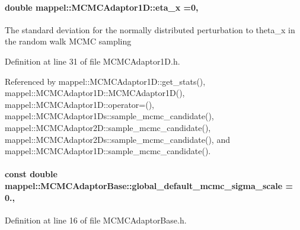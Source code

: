 \paragraph[{\texorpdfstring{eta\+\_\+x}{eta_x}}]{\setlength{\rightskip}{0pt plus 5cm}double mappel\+::\+M\+C\+M\+C\+Adaptor1\+D\+::eta\+\_\+x =0\hspace{0.3cm}{\ttfamily [protected]}, {\ttfamily [inherited]}}\hypertarget{classmappel_1_1MCMCAdaptor1D_ae5787e38c9cef6168acf6fc5d3216693}{}\label{classmappel_1_1MCMCAdaptor1D_ae5787e38c9cef6168acf6fc5d3216693}
The standard deviation for the normally distributed perturbation to theta\+\_\+x in the random walk M\+C\+MC sampling 

Definition at line 31 of file M\+C\+M\+C\+Adaptor1\+D.\+h.



Referenced by mappel\+::\+M\+C\+M\+C\+Adaptor1\+D\+::get\+\_\+stats(), mappel\+::\+M\+C\+M\+C\+Adaptor1\+D\+::\+M\+C\+M\+C\+Adaptor1\+D(), mappel\+::\+M\+C\+M\+C\+Adaptor1\+D\+::operator=(), mappel\+::\+M\+C\+M\+C\+Adaptor1\+Ds\+::sample\+\_\+mcmc\+\_\+candidate(), mappel\+::\+M\+C\+M\+C\+Adaptor2\+D\+::sample\+\_\+mcmc\+\_\+candidate(), mappel\+::\+M\+C\+M\+C\+Adaptor2\+Ds\+::sample\+\_\+mcmc\+\_\+candidate(), and mappel\+::\+M\+C\+M\+C\+Adaptor1\+D\+::sample\+\_\+mcmc\+\_\+candidate().

\paragraph[{\texorpdfstring{global\+\_\+default\+\_\+mcmc\+\_\+sigma\+\_\+scale}{global_default_mcmc_sigma_scale}}]{\setlength{\rightskip}{0pt plus 5cm}const double mappel\+::\+M\+C\+M\+C\+Adaptor\+Base\+::global\+\_\+default\+\_\+mcmc\+\_\+sigma\+\_\+scale = 0.\hspace{0.3cm}{\ttfamily [static]}, {\ttfamily [inherited]}}\hypertarget{classmappel_1_1MCMCAdaptorBase_a44cebca0e27135c854fa8430d2d89929}{}\label{classmappel_1_1MCMCAdaptorBase_a44cebca0e27135c854fa8430d2d89929}


Definition at line 16 of file M\+C\+M\+C\+Adaptor\+Base.\+h.



